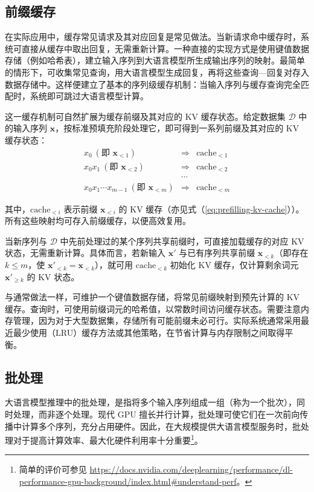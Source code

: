 \subsection{前缀缓存}

在实际应用中，缓存常见请求及其对应回复是常见做法。当新请求命中缓存时，系统可直接从缓存中取出回复，无需重新计算。一种直接的实现方式是使用键值数据存储（例如哈希表），建立输入序列到大语言模型所生成输出序列的映射。最简单的情形下，可收集常见查询，用大语言模型生成回复，再将这些查询—回复对存入数据存储中。这样便建立了基本的序列级缓存机制：当输入序列与缓存查询完全匹配时，系统即可跳过大语言模型计算。

这一缓存机制可自然扩展为缓存前缀及其对应的 KV 缓存状态。给定数据集 $\mathcal{D}$ 中的输入序列 $\mathbf{x}$，按标准预填充阶段处理它，即可得到一系列前缀及其对应的 KV 缓存状态：
\begin{eqnarray}
x_0\ (\text{即 } \mathbf{x}_{<1}) & \Rightarrow & \mathrm{cache}_{<1} \nonumber \\
x_0 x_1\ (\text{即 } \mathbf{x}_{<2}) & \Rightarrow & \mathrm{cache}_{<2} \nonumber \\
& \cdots & \nonumber \\
x_0 x_1 \cdots x_{m-1}\ (\text{即 } \mathbf{x}_{<m}) & \Rightarrow & \mathrm{cache}_{<m} \nonumber
\end{eqnarray}

\noindent 其中，$\mathrm{cache}_{<i}$ 表示前缀 $\mathbf{x}_{<i}$ 的 KV 缓存（亦见式（\ref{eq:prefilling-kv-cache}））。所有这些映射均可存入前缀缓存，以便高效复用。

当新序列与 $\mathcal{D}$ 中先前处理过的某个序列共享前缀时，可直接加载缓存的对应 KV 状态，无需重新计算。具体而言，若新输入 $\mathbf{x}'$ 与已有序列共享前缀 $\mathbf{x}_{<k}$（即存在 $k \le m$，使 $\mathbf{x}'_{<k} = \mathbf{x}_{<k}$），就可用 $\mathrm{cache}_{<k}$ 初始化 KV 缓存，仅计算剩余词元 $\mathbf{x}'_{\ge k}$ 的 KV 状态。

与通常做法一样，可维护一个键值数据存储，将常见前缀映射到预先计算的 KV 缓存。查询时，可使用前缀词元的哈希值，以常数时间访问缓存状态。需要注意内存管理，因为对于大型数据集，存储所有可能前缀未必可行。实际系统通常采用最近最少使用（LRU）缓存方法或其他策略，在节省计算与内存限制之间取得平衡。

\subsection{批处理}

大语言模型推理中的批处理，是指将多个输入序列组成一组（称为一个批次），同时处理，而非逐个处理。现代 GPU 擅长并行计算，批处理可使它们在一次前向传播中计算多个序列，充分占用硬件。因此，在大规模提供大语言模型服务时，批处理对于提高计算效率、最大化硬件利用率十分重要\footnote{简单的评价可参见 \url{https://docs.nvidia.com/deeplearning/performance/dl-performance-gpu-background/index.html\#understand-perf}。}。

